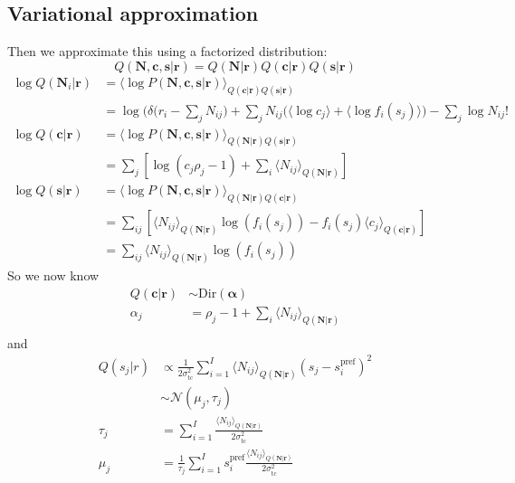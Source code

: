 \documentclass[12pt]{article}
\begin{document}
\subsection{Variational approximation}
Then we approximate this using a factorized distribution:
\begin{equation}
Q(\mathbf{N, c, s|r}) = Q(\mathbf{N|r}) Q(\mathbf{c|r}) Q(\mathbf{s|r})
\end{equation}
\begin{equation}
\begin{aligned}
\log Q(\mathbf{N}_i|\mathbf{r}) &= \langle \log P(\mathbf{N, c, s|r}) \rangle_{Q(\mathbf{c|r})Q(\mathbf{s|r})}\\
&= \log(\delta \Big( r_i - \sum_j N_{ij} \Big) + \sum_j N_{ij}\big( \langle \log c_j \rangle + \langle \log f_i(s_j) \rangle \big) - \sum_j \log N_{ij}!\\
\log Q(\mathbf{c|r}) &= \langle \log P(\mathbf{N, c, s|r}) \rangle_{Q(\mathbf{N|r})Q(\mathbf{s|r})}\\
&= \sum_j [\log (c_j \rho_j - 1) + \sum_i \langle N_{ij} \rangle_{Q(\mathbf{N|r})}]\\
\log Q(\mathbf{s|r}) &= \langle \log P(\mathbf{N, c, s|r}) \rangle_{Q(\mathbf{N|r})Q(\mathbf{c|r})}\\
&= \sum_{ij} [\langle N_{ij} \rangle_{Q(\mathbf{N|r})} \log(f_i(s_j)) - f_i(s_j) \langle c_j \rangle_{Q(\mathbf{c|r})}]\\ 
&= \sum_{ij} \langle N_{ij} \rangle_{Q(\mathbf{N|r})} \log(f_i(s_j))
\end{aligned}
\end{equation}
So we now know
\begin{equation}
\begin{aligned}
Q(\mathbf{c|r}) &\sim \text{Dir}(\boldsymbol{\alpha})\\
\alpha_j &= \rho_j - 1 + \sum_i \langle N_{ij} \rangle_{Q(\mathbf{N|r})}\\
\end{aligned}
\end{equation}
and 
\begin{equation}
\begin{aligned}
Q(s_j|r) &\propto \frac{1}{2 \sigma_{\text{tc}}^2} \sum_{i=1}^I \langle N_{ij} \rangle_{Q(\mathbf{N|r})} (s_j - s_i^{\text{pref}})^2\\
&\sim \mathcal{N} (\mu_j, \tau_j)\\ 
\tau_j &= \sum_{i=1}^I \frac{\langle N_{ij} \rangle_{Q(\mathbf{N|r})}}{2 \sigma_{\text{tc}}^2}\\
\mu_j &= \frac{1}{\tau_j} \sum_{i=1}^I s_i^{\text{pref}} \frac{\langle N_{ij} \rangle_{Q(\mathbf{N|r})}}{2 \sigma_{\text{tc}}^2}\\
\end{aligned}
\end{equation}
\end{document}
